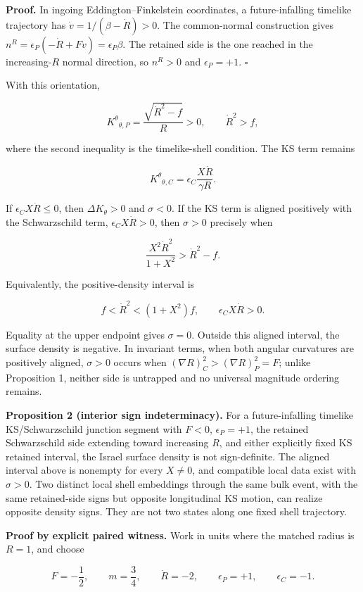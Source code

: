 \documentclass[pdflatex,sn-mathphys-num]{sn-jnl}
\begin{document}
\textbf{Proof.} In ingoing Eddington--Finkelstein coordinates, a future-infalling timelike trajectory has \(\dot v=1/(\beta-\dot R)>0\). The common-normal construction gives \(n^R=\epsilon_P(-\dot R+F\dot v)=\epsilon_P\beta\). The retained side is the one reached in the increasing-\(R\) normal direction, so \(n^R>0\) and \(\epsilon_P=+1\). \(\square\)


With this orientation,


\[
K^\theta{}_{\theta,P}=\frac{\sqrt{\dot R^2-f}}{R}>0,
\qquad
\dot R^2>f,
\]

where the second inequality is the timelike-shell condition. The KS term remains


\[
K^\theta{}_{\theta,C}
=\epsilon_C\frac{X\dot R}{\gamma R}.
\]

If \(\epsilon_CX\dot R\le0\), then \(\Delta K_\theta>0\) and \(\sigma<0\). If the KS term is aligned positively with the Schwarzschild term, \(\epsilon_CX\dot R>0\), then \(\sigma>0\) precisely when


\[
\frac{X^2\dot R^2}{1+X^2}>\dot R^2-f.
\]

Equivalently, the positive-density interval is


\[
\boxed{
f<\dot R^2<(1+X^2)f,
\qquad
\epsilon_CX\dot R>0.
}
\]

Equality at the upper endpoint gives \(\sigma=0\). Outside this aligned interval, the surface density is negative. In invariant terms, when both angular curvatures are positively aligned, \(\sigma>0\) occurs when \((\nabla R)^2_C>(\nabla R)^2_P=F\); unlike Proposition 1, neither side is untrapped and no universal magnitude ordering remains.


\textbf{Proposition 2 (interior sign indeterminacy).} For a future-infalling timelike KS/Schwarzschild junction segment with \(F<0\), \(\epsilon_P=+1\), the retained Schwarzschild side extending toward increasing \(R\), and either explicitly fixed KS retained interval, the Israel surface density is not sign-definite. The aligned interval above is nonempty for every \(X\ne0\), and compatible local data exist with \(\sigma>0\). Two distinct local shell embeddings through the same bulk event, with the same retained-side signs but opposite longitudinal KS motion, can realize opposite density signs. They are not two states along one fixed shell trajectory.


\textbf{Proof by explicit paired witness.} Work in units where the matched radius is \(R=1\), and choose


\[
F=-\frac12,
\qquad
m=\frac34,
\qquad
\dot R=-2,
\qquad
\epsilon_P=+1,
\qquad
\epsilon_C=-1.
\]
\end{document}
